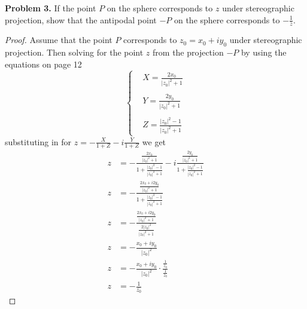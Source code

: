 \documentclass[letter,12pt]{article}
\begin{document}
\begin{tcolorbox}
    \textbf{Problem 3.} If the point $P$ on the sphere corresponds to $z$ under stereographic projection, show that the antipodal point $-P$ on the sphere corresponds to $-\frac{1}{\overline{z}}$.
\end{tcolorbox}

\begin{proof}
    Assume that the point $P$ corresponds to $z_0=x_0+iy_0$ under stereographic projection. Then solving for the point $z$ from the projection $-P$ by using the equations on page 12
    \[
        \begin{cases}
             & X=\frac{2x_0}{|z_0|^2+1}       \\
            \\
             & Y = \frac{2y_0}{|z_0|^2+1}     \\
            \\
             & Z= \frac{|z_0|^2-1}{|z_0|^2+1}
        \end{cases}
    \] substituting in for $z=-\frac{X}{1+Z}-i\frac{Y}{1+Z}$ we get
    \begin{align*}
        z & =-\frac{\frac{2x_0}{|z_0|^2+1}}{1+\frac{|z_0|^2-1}{|z_0|^2+1}}-i\frac{\frac{2y_0}{|z_0|^2+1}}{1+\frac{|z_0|^2-1}{|z_0|^2+1}} \\
        z & = -\frac{\frac{2x_0+i2y_0}{|z_0|^2+1}}{1+\frac{|z_0|^2-1}{|z_0|^2+1}}                                                        \\
        z & = -\frac{\frac{2x_0+i2y_0}{|z_0|^2+1}}{\frac{2|z_0|^2}{|z_0|^2+1}}
        \\
        z & = -\frac{x_0+iy_0}{|z_0|^2}                                                                                                  \\
        z & = -\frac{x_0+iy_0}{|z_0|^2}\cdot \frac{\frac{1}{z_0}}{\frac{1}{z_0}}                                                         \\
        z & = -\frac{1}{\bar{z_0}}
    \end{align*}



\end{proof}
\end{document}
